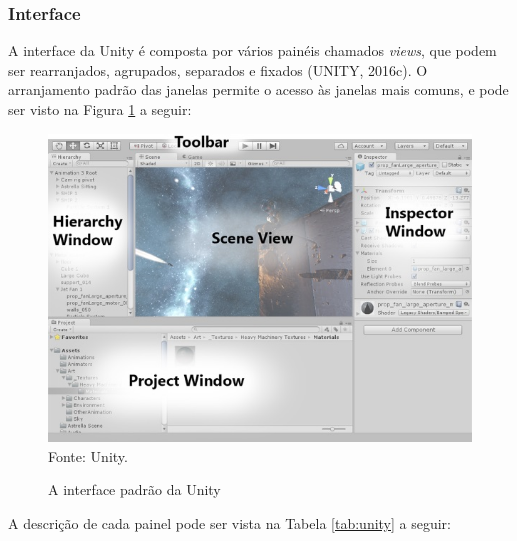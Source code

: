 \documentclass[12pt,a4paper]{article}
\newcommand{\source}[1]{\small Fonte: {#1}}
\begin{document}
		\FloatBarrier
		\subsubsection{Interface}
			A interface da Unity é composta por vários painéis chamados \textit{views},
			que podem ser rearranjados, agrupados, separados e fixados
			(UNITY, 2016c).
			O arranjamento padrão das janelas permite o acesso às janelas mais comuns,
			e pode ser visto na Figura \ref{fig:interfaceUnity} a seguir:
			
			\begin{figure}[ht!]
				\caption{A interface padrão da Unity}
				\centering
				\includegraphics[scale=0.5]{InterfaceUnity.jpg}\\
				\vspace{0.5mm}
				\source{Unity.}
				\label{fig:interfaceUnity}
			\end{figure}	
			
			A descrição de cada painel pode ser vista na Tabela \ref{tab:unity} a seguir:
			
\end{document}
